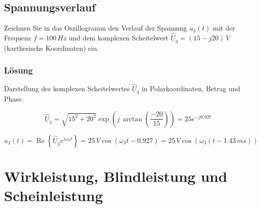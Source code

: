 \documentclass[
  ngerman,
  letterpaper,
]{scrbook}
\begin{document}
\subsection{Spannungsverlauf}\label{spannungsverlauf}

Zeichnen Sie in das Oszillogramm den Verlauf der Spannung \(u_3(t)\) mit
der Frequenz \(f=100\,Hz\) und dem komplexen Scheitelwert
\(\underline{\hat{U}}_3 = (15-j 20)\,V\) (karthesische Koordinaten) ein.

\subsubsection{Lösung}\label{luxf6sung-11}

Darstellung des komplexen Scheitelwertes \(\underline{\hat{U}}_3\) in
Polarkoordinaten, Betrag und Phase.

\[
\underline{\hat{U}}_3 = \sqrt{15^2 + 20^2} \exp \left(j \,\arctan\left(\frac{-20}{15}\right)\right) 
= 25 e^{-j 0.927} 
\]

\[
u_3(t) = \operatorname{Re}\left\{\underline{\hat{U}}_3e^{j\omega_3 t}\right\} 
= 25\,V \cos(\omega_3 t - 0.927) = 25\,V \cos\left(\omega_3 (t - 1.43\,ms)\right)
\]

\section{Wirkleistung, Blindleistung und
Scheinleistung}\label{wirkleistung-blindleistung-und-scheinleistung}
\end{document}

